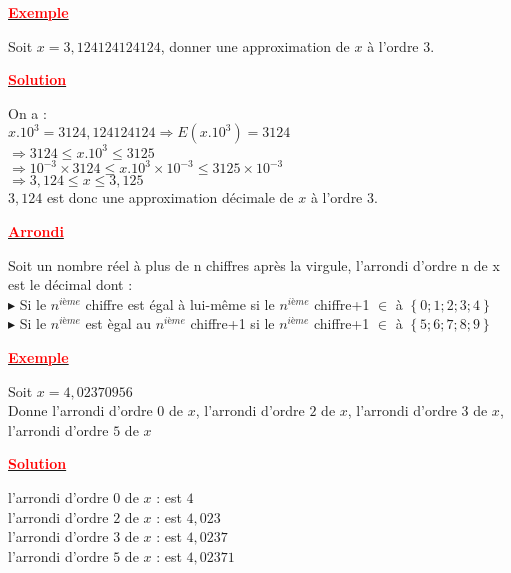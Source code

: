 \documentclass[12pt]{article}
\begin{document}
\begin{center}
\underline{\textbf{\textcolor{red}{Exemple}}}\\
\end{center}
Soit 
$x=3,124124124124$, donner une approximation de $x$ à l'ordre $3$.
\begin{center}
\underline{\textbf{\textcolor{red}{Solution}}}\\
\end{center}
On a :\\
$ x.10^{3}=3124,124124124 \Longrightarrow E(x.10^{3})=3124 $\\
$ \Longrightarrow 3124 \leq x.10^{3} \leq 3125 $\\
$ \Longrightarrow 10^{-3}\times 3124 \leq x.10^{3} \times 10^{-3} \leq 3125 \times 10^{-3}$\\
$ \Longrightarrow 3,124 \leq x \leq 3,125 $\\
$3,124$ est donc une approximation décimale de $x$ à l'ordre $3$.

\begin{center}
\underline{\textbf{\textcolor{red}{Arrondi}}}\\
\end{center} 
Soit un nombre réel à plus de n chiffres après la virgule, l'arrondi d'ordre n de x est le décimal dont :\\
$\blacktriangleright$ Si le $n^{ième}$ chiffre est égal à lui-même si le $n^{ième}$ chiffre+1 $\in$ à $\left\lbrace 0;1;2;3;4 \right\rbrace $\\
$\blacktriangleright$ Si le $n^{ième}$ est ègal au $n^{ième}$ chiffre+1 si le $n^{ième}$ chiffre+1 $\in$ à $\left\lbrace 5;6;7;8;9 \right\rbrace $\\
\begin{center}
\underline{\textbf{\textcolor{red}{Exemple}}}\\
\end{center} 
Soit $x=4,02370956$\\
Donne l'arrondi d'ordre $0$ de $x$, l'arrondi d'ordre $2$ de $x$, l'arrondi d'ordre $3$ de $x$, l'arrondi d'ordre $5$ de $x$\\
\begin{center}
\underline{\textbf{\textcolor{red}{Solution}}}\\
\end{center}
l'arrondi d'ordre $0$ de $x$ : est $4$\\
l'arrondi d'ordre $2$ de $x$ : est $4,023$\\
l'arrondi d'ordre $3$ de $x$ : est $4,0237$\\
l'arrondi d'ordre $5$ de $x$ : est $4,02371$\\
\end{document}
